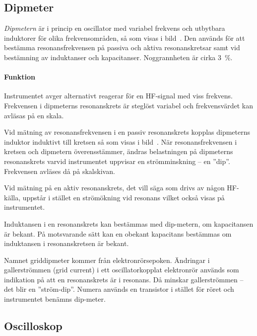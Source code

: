\subsection{Dipmeter}



\emph{Dipmetern} är i princip en oscillator med variabel frekvens och utbytbara
induktorer för olika frekvensområden, så som visas i bild~.
Den används för att bestämma resonansfrekvensen på passiva och aktiva
resonanskretsar samt vid bestämning av induktanser och kapacitanser.
Noggrannheten är cirka \qty{3}{\percent}.

\paragraph{Funktion}
Instrumentet avger alternativt reagerar för en HF-signal med viss frekvens.
Frekvensen i dipmeterns resonanskrets är steglöst variabel och frekvensvärdet
kan avläsas på en skala.

Vid mätning av resonansfrekvensen i en passiv resonanskrets kopplas dipmeterns
induktor induktivt till kretsen så som visas i bild~.
När resonansfrekvensen i kretsen och dipmetern överensstämmer, ändras 
belastningen på dipmeterns resonanskrets varvid instrumentet uppvisar en
strömminskning -- en ''dip''.
Frekvensen avläses då på skalskivan.

Vid mätning på en aktiv resonanskrets, det vill säga som drivs av någon
HF-källa, uppstår i stället en strömökning vid resonans vilket också visas på
instrumentet.

Induktansen i en resonanskrets kan bestämmas med dip-metern, om kapacitansen
är bekant.
På motsvarande sätt kan en obekant kapacitans bestämmas om induktansen i
resonanskretsen är bekant.

Namnet griddipmeter kommer från elektronrörsepoken.
Ändringar i gallerströmmen (grid current) i ett oscillatorkopplat elektronrör
används som indikation på att en resonanskrets är i resonans.
Då minskar gallerströmmen -- det blir en ''ström-dip''.
Numera används en transistor i stället för röret och instrumentet benämns
dip-meter.

\subsection{Oscilloskop}

